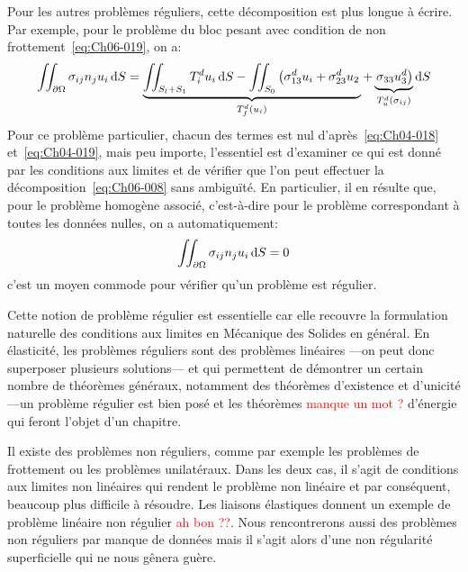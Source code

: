 Pour les autres problèmes réguliers, cette décomposition est plus longue à écrire.
Par exemple, pour le problème du bloc pesant avec condition de non frottement~\eqref{eq:Ch06-019}, on a:
\begin{equation}
    \iint_{\partial \Omega} \sigma_{ij} n_j u_i \mathop{\mathrm{{}d}}\mathopen{} S = \underbrace{\iint_{S_l +S_1} T_i^d u_i \mathop{\mathrm{{}d}}\mathopen{} S - \iint_{S_0} \left( \sigma_{13}^d u_i + \sigma_{23}^d u_2 \right.}_{T_f^d\left( u_i \right)} + \underbrace{ \left.\sigma_{33} u_3^d \right)}_{T_u^d\left(\sigma_{ij} \right)} \mathop{\mathrm{{}d}}\mathopen{} S
    \label{eq:Ch06-010}
\end{equation}
Pour ce problème particulier, chacun des termes est nul d'après~\eqref{eq:Ch04-018} et~\eqref{eq:Ch04-019}, mais peu importe, l'essentiel est d'examiner ce qui est donné par les conditions aux limites et de vérifier que l'on peut effectuer la décomposition~\eqref{eq:Ch06-008} sans ambiguïté.
En particulier, il en résulte que, pour le problème homogène associé, c'est-à-dire pour le problème correspondant à toutes les données nulles, on a automatiquement:
\begin{equation}
    \iint_{\partial \Omega} \sigma_{ij} n_j u_i \mathop{\mathrm{{}d}}\mathopen{} S = 0
    \label{eq:Ch06-011}
\end{equation}
c'est un moyen commode pour vérifier qu'un problème est régulier.

Cette notion de problème régulier est essentielle car elle recouvre la formulation naturelle des conditions aux limites en Mécanique des Solides en général.
En élasticité, les problèmes réguliers sont des problèmes linéaires ---on peut donc superposer plusieurs solutions--- et qui permettent de démontrer un certain nombre de théorèmes généraux, notamment des théorèmes d'existence et d'unicité ---un problème régulier est bien posé et les théorèmes \textcolor{red}{manque un mot ?} d'énergie qui feront l'objet d'un chapitre.

Il existe des problèmes non réguliers, comme par exemple les problèmes de frottement ou les problèmes unilatéraux.
Dans les deux cas, il s'agit de conditions aux limites non linéaires qui rendent le problème non linéaire et par conséquent, beaucoup plus difficile à résoudre.
Les liaisons élastiques donnent un exemple de problème linéaire non régulier \textcolor{red}{ah bon ??}.
Nous rencontrerons aussi des problèmes non réguliers par manque de données mais il s'agit alors d'une non régularité superficielle qui ne nous gênera guère.

